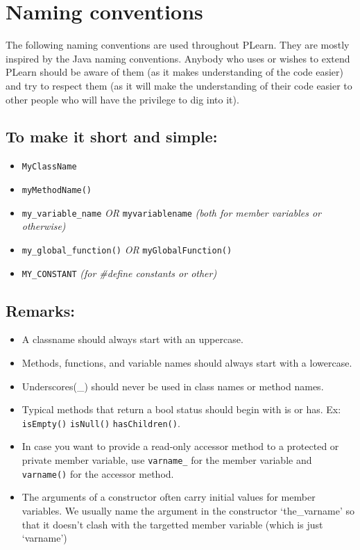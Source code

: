 \documentclass[11pt]{book}
\begin{document}
\section{Naming conventions}

 The following naming conventions are used throughout PLearn. They
are mostly inspired by the Java naming conventions. Anybody who
uses or wishes to extend PLearn should be aware of them (as it makes
understanding of the code easier) and try to respect them (as it will
make the understanding of their code easier to other people who will
have the privilege to dig into it).

\subsection*{To make it short and simple:}

\begin{itemize}
\item {\tt MyClassName}
\item {\tt myMethodName()}
\item {\tt my\_variable\_name} \emph{OR }
      {\tt myvariablename} \emph{(both for member variables or otherwise)}

\item {\tt my\_global\_function()} \emph{OR}
      {\tt myGlobalFunction()}
\item {\tt MY\_CONSTANT}  \emph{(for \#define constants or other)}

\end{itemize}

\subsection*{Remarks:}

\begin{itemize}

\item A classname should always start with an uppercase.

\item Methods, functions, and variable names should always start with a
lowercase.

\item Underscores(\_) should never be used in class names or method
names.

\item Typical methods that return a bool status should begin with is or
has. Ex: {\tt isEmpty()} {\tt isNull()} {\tt hasChildren()}.

\item In case you want to provide a read-only accessor method to a
protected or private member variable, use {\tt varname\_} for the member
variable and {\tt varname()} for the accessor method.

\item The arguments of a constructor often carry initial values for
member variables. We usually name the argument in the constructor
`the\_varname' so that it doesn't clash with the targetted member
variable (which is just `varname')

\end{itemize}
\end{document}
